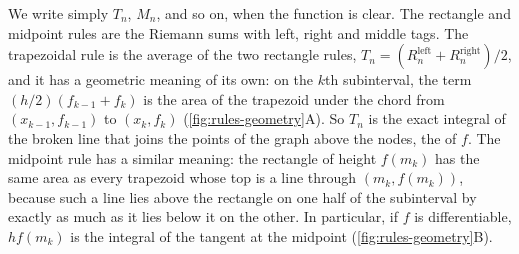 We write simply $T_n$, $M_n$, and so on, when the function is clear. The rectangle and midpoint rules are the Riemann sums with left, right and middle tags. The trapezoidal rule is the average of the two rectangle rules, $T_n=(R^{\mathrm{left}}_n+R^{\mathrm{right}}_n)/2$, and it has a geometric meaning of its own: on the $k$th subinterval, the term $(h/2)(f_{k-1}+f_k)$ is the area of the trapezoid under the chord from $(x_{k-1},f_{k-1})$ to $(x_k,f_k)$ (\cref{fig:rules-geometry}A). So $T_n$ is the exact integral of the broken line that joins the points of the graph above the nodes, the  of $f$. The midpoint rule has a similar meaning: the rectangle of height $f(m_k)$ has the same area as every trapezoid whose top is a line through $(m_k,f(m_k))$, because such a line lies above the rectangle on one half of the subinterval by exactly as much as it lies below it on the other. In particular, if $f$ is differentiable, $hf(m_k)$ is the integral of the tangent at the midpoint (\cref{fig:rules-geometry}B).

